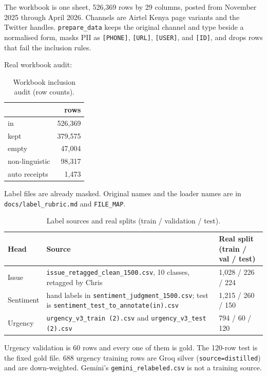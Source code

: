 \documentclass[11pt,a4paper]{article}
\begin{document}
The workbook is one sheet, 526,369 rows by 29 columns, posted from November 2025 through April 2026. Channels are Airtel Kenya page variants and the Twitter handles. \texttt{prepare\_\allowbreak{}data} keeps the original channel and type beside a normalised form, masks PII as \texttt{[PHONE]}, \texttt{[URL]}, \texttt{[USER]}, and \texttt{[ID]}, and drops rows that fail the inclusion rules.

Real workbook audit:

\begin{table}[H]
\centering
\caption{Workbook inclusion audit (row counts).}
\begin{tabular}{lr}
\toprule
 & rows \\
\midrule
in & 526,369 \\
kept & 379,575 \\
empty & 47,004 \\
non-linguistic & 98,317 \\
auto receipts & 1,473 \\
\bottomrule
\end{tabular}
\end{table}

Label files are already masked. Original names and the loader names are in \texttt{docs/\allowbreak{}label\_\allowbreak{}rubric.md} and \texttt{FILE\_\allowbreak{}MAP}.

\begin{table}[H]
\centering
\caption{Label sources and real splits (train / validation / test).}
\small
\begin{tabularx}{\textwidth}{l>{\raggedright\arraybackslash}Xl}
\toprule
Head & Source & Real split (train / val / test) \\
\midrule
Issue & \texttt{issue\_\allowbreak{}retagged\_\allowbreak{}clean\_\allowbreak{}1500.csv}, 10 classes, retagged by Chris & 1,028 / 226 / 224 \\
Sentiment & hand labels in \texttt{sentiment\_\allowbreak{}judgment\_\allowbreak{}1500.csv}; test is \texttt{sentiment\_\allowbreak{}test\_\allowbreak{}to\_\allowbreak{}annotate(in).csv} & 1,215 / 260 / 150 \\
Urgency & \texttt{urgency\_\allowbreak{}v3\_\allowbreak{}train (2).csv} and \texttt{urgency\_\allowbreak{}v3\_\allowbreak{}test (2).csv} & 794 / 60 / 120 \\
\bottomrule
\end{tabularx}
\end{table}

Urgency validation is 60 rows and every one of them is gold. The 120-row test is the fixed gold file. 688 urgency training rows are Groq silver (\texttt{source=distilled}) and are down-weighted. Gemini's \texttt{gemini\_\allowbreak{}relabeled.csv} is not a training source.
\end{document}
